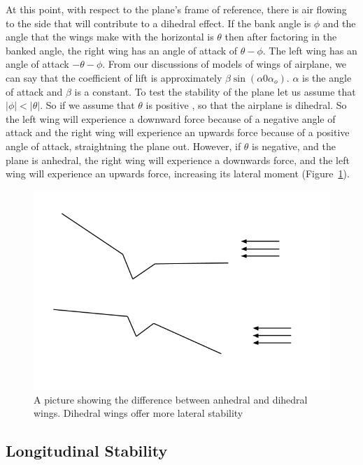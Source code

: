At this point, with respect to the plane's frame of reference, there is air flowing 
to the side that will contribute to a dihedral effect. 
If the bank angle is $\phi$ and
the angle that the wings make with the horizontal is $\theta$ then after factoring in
the banked angle, the right wing has an angle of attack of  $\theta - \phi$.
The left wing has an angle of attack $- \theta - \phi$.
From our discussions of models of wings of airplane, we can say that the
coefficient of lift is approximately $\beta \sin(\alpha 0 \alpha_o)$.
$\alpha$ is the angle of attack and $\beta$ is a constant. To test the stability of the plane
let us assume that $|\phi| < |\theta|$.
So if we assume that $\theta$ is positive , so that the airplane is dihedral.
So the left wing will experience a downward force because of a negative angle of attack
and the right wing will experience an upwards force because of a positive angle of attack, straightning the plane out.
However, if $\theta$ is negative, and the plane is anhedral, the right wing will experience a
downwards force, and the left wing will experience an upwards force, increasing its lateral moment
(Figure~\ref{fig:dihedral2}). 


\begin{figure}[hl]
  \centering
    \includegraphics[scale=.5]{figures/dihedral2.png}
    \caption{A picture showing the difference between anhedral and dihedral wings. Dihedral wings offer 
    more lateral stability}
  \label{fig:dihedral2}
\end{figure}


\subsection{Longitudinal Stability}
\label{sec:long_stability}

